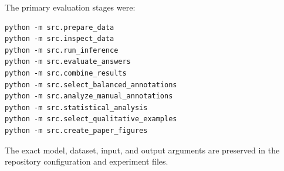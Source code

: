 \documentclass{article}
\begin{document}
The primary evaluation stages were:

\begin{verbatim}
python -m src.prepare_data
python -m src.inspect_data
python -m src.run_inference
python -m src.evaluate_answers
python -m src.combine_results
python -m src.select_balanced_annotations
python -m src.analyze_manual_annotations
python -m src.statistical_analysis
python -m src.select_qualitative_examples
python -m src.create_paper_figures
\end{verbatim}

The exact model, dataset, input, and output arguments are preserved in
the repository configuration and experiment files.





\end{document}

